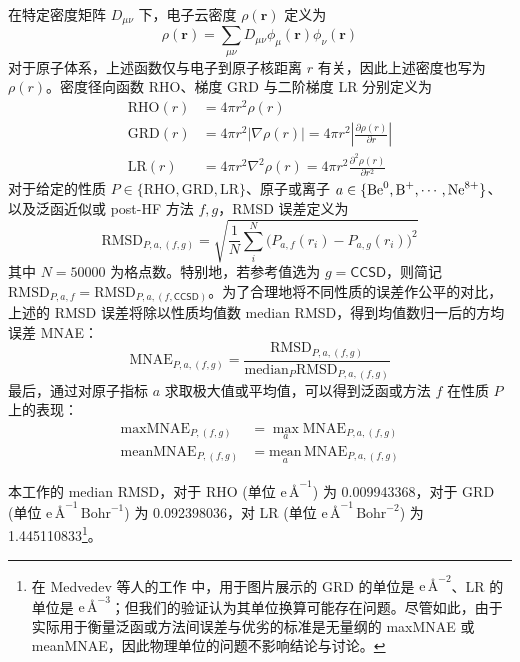 在特定密度矩阵 $D_{\mu \nu}$ 下，电子云密度 $\rho(\bm{r})$ 定义为
\begin{equation}
    \rho(\bm{r}) = \sum_{\mu \nu} D_{\mu \nu} \phi_{\mu} (\bm{r}) \phi_{\nu} (\bm{r})
\end{equation}
对于原子体系，上述函数仅与电子到原子核距离 $r$ 有关，因此上述密度也写为 $\rho(r)$。密度径向函数 RHO、梯度 GRD 与二阶梯度 LR 分别定义为
\begin{align}
    \text{RHO}(r) &= 4 \pi r^2 \rho(r) \\
    \text{GRD}(r) &= 4 \pi r^2 | \nabla \rho(r) | = 4 \pi r^2 \left| \frac{\partial \rho(r)}{\partial r} \right| \\
    \text{LR}(r) &= 4 \pi r^2 \nabla^2 \rho(r) = 4 \pi r^2 \frac{\partial^2 \rho(r)}{\partial r^2}
\end{align}
对于给定的性质 $P \in \{\text{RHO}, \text{GRD}, \text{LR}\}$、原子或离子 $a \in \{\ce{Be^0}, \ce{B^+}, \cdots, \ce{Ne^8+}\}$、以及泛函近似或 post-HF 方法 $f, g$，RMSD 误差定义为
\begin{equation}
    \text{RMSD}_{P, a, (f, g)} = \sqrt{\frac{1}{N} \sum_i^N \big(P_{a, f} (r_i) - P_{a, g} (r_i) \big)^2}
\end{equation}
其中 $N = 50000$ 为格点数。特别地，若参考值选为 $g = \textsf{CCSD}$，则简记 $\text{RMSD}_{P, a, f} = \text{RMSD}_{P, a, (f, \textsf{CCSD})}$。为了合理地将不同性质的误差作公平的对比，上述的 RMSD 误差将除以性质均值数 median RMSD，得到均值数归一后的方均误差 MNAE：
\begin{equation}
    \text{MNAE}_{P, a, (f, g)} = \frac{\text{RMSD}_{P, a, (f, g)}}{\text{median}_{P} \text{RMSD}_{P, a, (f, g)}}
\end{equation}
最后，通过对原子指标 $a$ 求取极大值或平均值，可以得到泛函或方法 $f$ 在性质 $P$ 上的表现：
\begin{align}
    \text{maxMNAE}_{P, (f, g)} &= \max_a \text{MNAE}_{P, a, (f, g)} \\
    \text{meanMNAE}_{P, (f, g)} &= \underset{a}{\text{mean}} \, \text{MNAE}_{P, a, (f, g)}
\end{align}

本工作的 median RMSD，对于 RHO (单位 $\text{e} \, \text{\AA}^{-1}$) 为 0.009943368，对于 GRD (单位 $\text{e} \, \text{\AA}^{-1} \, \text{Bohr}^{-1}$) 为 0.092398036，对 LR (单位 $\text{e} \, \text{\AA}^{-1} \, \text{Bohr}^{-2}$) 为 1.445110833\footnote{在 Medvedev 等人的工作\cite{Medvedev-Lyssenko.S.2017} 中，用于图片展示的 GRD 的单位是 $\text{e} \, \text{\AA}^{-2}$、LR 的单位是 $\text{e} \, \text{\AA}^{-3}$；但我们的验证认为其单位换算可能存在问题。尽管如此，由于实际用于衡量泛函或方法间误差与优劣的标准是无量纲的 maxMNAE 或 meanMNAE，因此物理单位的问题不影响结论与讨论。}。


